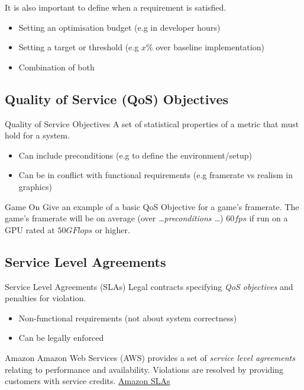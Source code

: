 It is also important to define when a requirement is satisfied.
\begin{itemize}
    \item Setting an optimisation budget (e.g in developer hours)
    \item Setting a target or threshold (e.g $x\%$ over baseline implementation)
    \item Combination of both
\end{itemize}

\subsection{Quality of Service (QoS) Objectives}
\begin{definitionbox}{Quality of Service Objectives}
    A set of statistical properties of a metric that must hold for a system.
    \begin{itemize}
        \item Can include preconditions (e.g to define the environment/setup)
        \item Can be in conflict with functional requirements (e.g framerate vs realism in graphics)
    \end{itemize}
\end{definitionbox}
\begin{examplebox}{Game On}
    Give an example of a basic QoS Objective for a game's framerate. 
    \tcblower
    The game's framerate will be on average (over \textit{\dots preconditions \dots}) $60fps$ if run on a GPU rated at $50GFlops$ or higher. 
\end{examplebox}

\subsection{Service Level Agreements}
\begin{definitionbox}{Service Level Agreements (SLAs)}
    Legal contracts specifying \textit{QoS objectives} and penalties for violation.
    \begin{itemize}
        \item Non-functional requirements (not about system correctness)
        \item Can be legally enforced
    \end{itemize}
\end{definitionbox}

\begin{sidenotebox}{Amazon}
    Amazon Web Services (AWS) provides a set of \textit{service level agreements} relating to performance and availability. Violations are resolved by providing customers with service credits.
    \href{https://aws.amazon.com/compute/sla/}{Amazon SLAs}
\end{sidenotebox}

